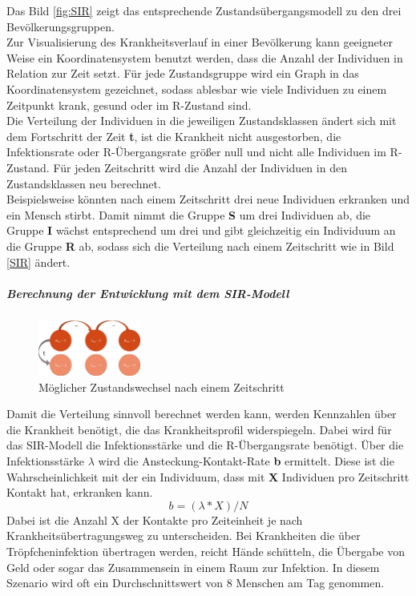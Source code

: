 Das Bild \ref{fig:SIR} zeigt das entsprechende Zustandsübergangsmodell zu den drei Bevölkerungsgruppen.\\
Zur Visualisierung des Krankheitsverlauf in einer Bevölkerung kann geeigneter Weise ein Koordinatensystem benutzt werden, dass die Anzahl der Individuen in Relation zur Zeit setzt.
Für jede Zustandsgruppe wird ein Graph in das Koordinatensystem gezeichnet, sodass ablesbar wie viele Individuen zu einem Zeitpunkt krank, gesund oder im \glqq R\grqq-Zustand sind.\\
Die Verteilung der Individuen in die jeweiligen Zustandsklassen ändert sich mit dem Fortschritt der Zeit \textbf{t}, ist die Krankheit nicht ausgestorben, die Infektionsrate oder \glqq R\grqq-Übergangsrate größer null und nicht alle Individuen im \glqq R\grqq-Zustand.
Für jeden Zeitschritt wird die Anzahl der Individuen in den Zustandsklassen neu berechnet.\\
Beispielsweise könnten nach einem Zeitschritt drei neue Individuen erkranken und ein Mensch stirbt. Damit nimmt die Gruppe  \textbf{S} um drei Individuen ab, die Gruppe \textbf{I} wächst entsprechend um drei und gibt gleichzeitig ein Individuum an die Gruppe \textbf{R} ab, sodass sich die Verteilung nach einem Zeitschritt wie in Bild \ref{SIR} ändert.
\subparagraph{Berechnung der Entwicklung mit dem SIR-Modell}
\begin{figure}
\includegraphics[width= 0.3\textwidth]{./images/SIR-Berechnung.jpg}\caption{Möglicher Zustandswechsel nach einem Zeitschritt}\label{fig:sch}
\end{figure}
Damit die Verteilung sinnvoll berechnet werden kann, werden Kennzahlen über die Krankheit benötigt, die das Krankheitsprofil widerspiegeln. Dabei wird für das SIR-Modell die Infektionsstärke und die \grqq R\glqq{}-Übergangsrate benötigt.
Über die Infektionsstärke $\lambda$ wird die Ansteckung-Kontakt-Rate \textbf{b} ermittelt. Diese ist die Wahrscheinlichkeit mit der ein Individuum, dass mit \textbf{X} Individuen pro Zeitschritt Kontakt hat, erkranken kann.
\begin{equation}
b = ( \lambda * X ) / N
\end{equation}
Dabei ist die Anzahl X der Kontakte pro Zeiteinheit je nach Krankheitsübertragungsweg zu unterscheiden. Bei Krankheiten die über Tröpfcheninfektion übertragen werden, reicht Hände schütteln, die Übergabe von Geld oder sogar das Zusammensein in einem Raum zur Infektion. In diesem Szenario wird oft ein Durchschnittswert von 8 Menschen am Tag genommen.%
